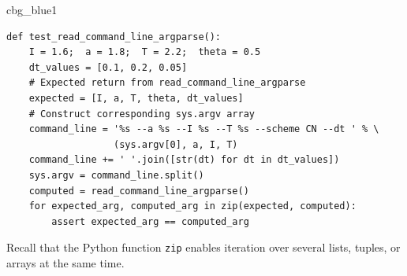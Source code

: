\documentclass[%
oneside,                 %
final,                   %
10pt]{article}
\newenvironment{_cod_tight}[1]{
   \def\FrameCommand{\colorbox{#1}}
   \FrameRule0.6pt\MakeFramed {\FrameRestore}\vskip3mm}
   {\vskip0mm\endMakeFramed}
\newenvironment{cod}[1]{
\bgroup\rmfamily
\fboxsep=0mm\relax
\begin{_cod_tight}{#1}
\list{}{\parsep=-2mm\parskip=0mm\topsep=0pt\leftmargin=2mm
\rightmargin=2\leftmargin\leftmargin=4pt\relax}
\item\relax}
{\endlist\end{_cod_tight}\egroup}
\begin{document}
\begin{cod}{cbg_blue1}\begin{Verbatim}[numbers=none,fontsize=\fontsize{9pt}{9pt},baselinestretch=0.95,xleftmargin=2mm]
def test_read_command_line_argparse():
    I = 1.6;  a = 1.8;  T = 2.2;  theta = 0.5
    dt_values = [0.1, 0.2, 0.05]
    # Expected return from read_command_line_argparse
    expected = [I, a, T, theta, dt_values]
    # Construct corresponding sys.argv array
    command_line = '%s --a %s --I %s --T %s --scheme CN --dt ' % \ 
                   (sys.argv[0], a, I, T)
    command_line += ' '.join([str(dt) for dt in dt_values])
    sys.argv = command_line.split()
    computed = read_command_line_argparse()
    for expected_arg, computed_arg in zip(expected, computed):
        assert expected_arg == computed_arg
\end{Verbatim}
\end{cod}
\noindent
Recall that the Python function \texttt{zip} enables iteration over
several lists, tuples, or arrays at the same time.
\end{document}
